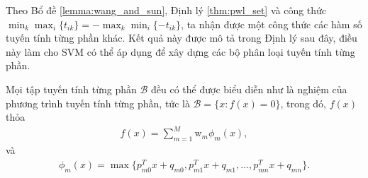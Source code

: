 Theo Bổ đề \ref{lemma:wang_and_sun}, Định lý \ref{thm:pwl_set} và công thức \( \min_k\max_i\{t_{ik}\} = -\max_k\min_i\{-t_{ik}\}\), ta nhận được một công thức các hàm số tuyến tính từng phần khác. Kết quả này được mô tả trong Định lý sau đây, điều này làm cho SVM có thể áp dụng để xây dựng các bộ phân loại tuyến tính từng phần.

\begin{theorem}
    Mọi tập tuyến tính từng phần \(\mathcal{B}\) đều có thể được biểu diễn như là nghiệm của phương trình tuyến tính từng phần, tức là \(\mathcal{B} = \{x: f(x)=0\}\), trong đó, \(f(x)\) thỏa
    \begin{align}
        f(x)=\displaystyle{\sum_{m=1}^{M}} \text{w}_m \phi_m(x),
        \label{eq:pwl_f}
    \end{align}
    và 
    \begin{align}
        \phi_m(x) = \max \{ p_{m0}^T x + q_{m0}, p_{m1}^T x + q_{m1}, \ldots , p_{mn}^T x + q_{mn}\}.
        \label{eq:pwl_phi}
    \end{align}
    \label{thm:pwl_funtion}
\end{theorem}




